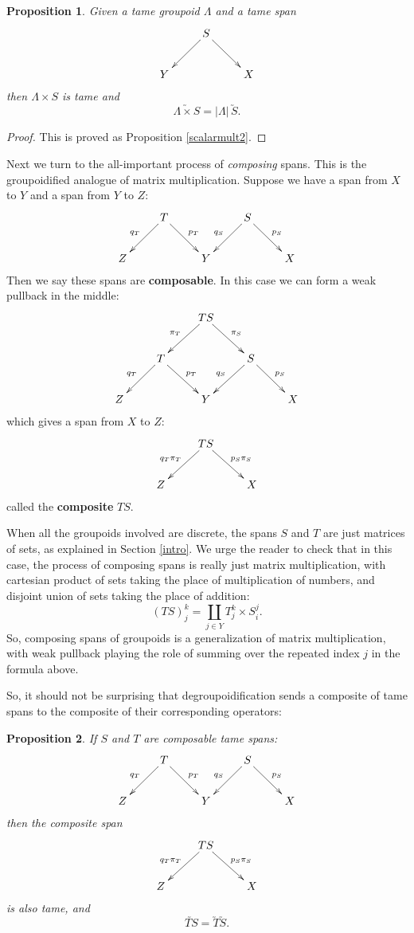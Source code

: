\documentclass{article}
\newtheorem*{proposition*}{Proposition}
\begin{document}
\begin{proposition*}
Given a tame groupoid $\Lambda$ and a tame span
\[
\xymatrix{
& S\ar[dl] \ar[dr] & \\
Y & & X
}
\]
then $\Lambda \times S$ is tame and
\[\utilde{\Lambda \times S} = |\Lambda| \, \utilde{S}.\]
\end{proposition*}
\begin{proof} This is proved as Proposition \ref{scalarmult2}.
\end{proof}

Next we turn to the all-important process of {\it composing} spans.
This is the groupoidified analogue of matrix multiplication.  Suppose
we have a span from $X$ to $Y$ and a span from $Y$ to $Z$:
\[
\xymatrix{
& T\ar[dl]_{q_T} \ar[dr]^{p_T} & & S \ar[dl]_{q_S} \ar[dr]^{p_S}& \\
Z & & Y & & X
}
\]  
Then we say these spans are {\bf composable}.
In this case we can form a weak pullback in the middle:
\[
\xymatrix{
& & TS \ar[dl]_{\pi_T} \ar[dr]^{\pi_S} & &\\
& T\ar[dl]_{q_T} \ar[dr]^{p_T} & & S \ar[dl]_{q_S} \ar[dr]^{p_S}& \\
Z & & Y & & X
}
\]  
which gives a span from $X$ to $Z$:
\[\xymatrix{
 & TS \ar[dl]_{q_T \pi_T} \ar[dr]^{p_S\pi_S} & \\
 Z & & X \\
}\]
called the {\bf composite} $TS$.

When all the groupoids involved are discrete, the spans $S$ and $T$
are just matrices of sets, as explained in Section \ref{intro}.  We urge
the reader to check that in this case, the process of composing spans
is really just matrix multiplication, with cartesian product of sets
taking the place of multiplication of numbers, and disjoint union of
sets taking the place of addition:
\[    (TS)^k_j = \coprod_{j \in Y} T^k_j \times S^j_i . \]
So, composing spans of groupoids is a generalization of matrix
multiplication, with weak pullback playing the role of summing
over the repeated index $j$ in the formula above.

So, it should not be surprising that degroupoidification sends
a composite of tame spans to the composite of their corresponding
operators:

\begin{proposition*} If $S$ and $T$ are composable tame spans:
\[
\xymatrix{
& T\ar[dl]_{q_T} \ar[dr]^{p_T} & & S \ar[dl]_{q_S} \ar[dr]^{p_S}& \\
Z & & Y & & X
}
\]  
then the composite span
\[\xymatrix{
 & TS \ar[dl]_{q_T \pi_T} \ar[dr]^{p_S\pi_S} & \\
 Z & & X \\
}\]
is also tame, and
\[       \utilde{TS} = \utilde{T} \utilde{S}  .\]
\end{proposition*}
\end{document}
